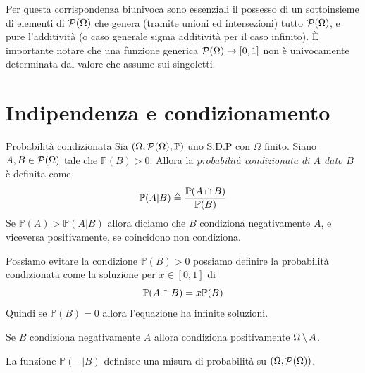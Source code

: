 \documentclass[a4paper]{article}
\begin{document}
Per questa corrispondenza biunivoca
sono essenziali il possesso di un sottoinsieme di elementi di \(\mathcal P(\Omega)\)
che genera (tramite unioni ed intersezioni) tutto \(\mathcal P(\Omega)\),
e pure l'additività (o caso generale sigma additività per il caso infinito).
È importante notare che una funzione generica \(\mathcal P(\Omega) \to [0,1]\)
non è univocamente determinata dal valore che assume sui singoletti.

\section{Indipendenza e condizionamento}

\begin{snippetdefinition}{Probabilità condizionata}
    Sia \((\Omega, \mathcal P(\Omega), \mathbb P)\) uno S.D.P
    con \(\Omega\) finito.
    Siano \(A, B \in \mathcal P(\Omega)\) tale che \(\mathbb P(B) > 0\).
    Allora la \emph{probabilità condizionata di \(A\) dato \(B\)} è definita come
    \[
        \mathbb P (A | B) \triangleq \frac{\mathbb P(A \cap B)}{\mathbb P(B)}
    \]
    Se \(\mathbb P(A) > \mathbb P(A | B)\) allora diciamo che \(B\) condiziona
    negativamente \(A\), e viceversa positivamente, se coincidono non condiziona.
\end{snippetdefinition}

Possiamo evitare la condizione \(\mathbb P(B) > 0\)
possiamo definire la probabilità condizionata
come la soluzione per \(x \in [0,1]\) di
\[ \mathbb P(A \cap B) = x \mathbb P (B) \]
Quindi se \(\mathbb P(B) = 0\) allora l'equazione ha infinite soluzioni.

Se \(B\) condiziona negativamente \(A\) allora condiziona positivamente \(\Omega \,\backslash\, A\).

\begin{snippetproposition}{}
    La funzione \(\mathbb P(-|B)\) definisce una misura di probabilità su \((\Omega, \mathcal P(\Omega))\).
\end{snippetproposition}
\end{document}
